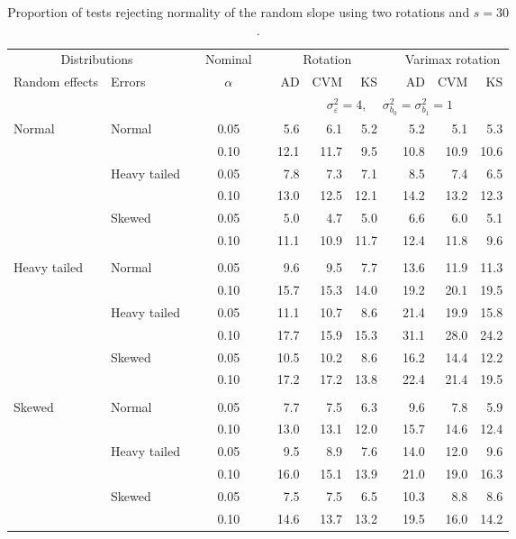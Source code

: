 \begin{table}[ht]
\centering
\caption{\label{tab:fixedsimb130} Proportion of tests rejecting normality of the random slope using two rotations and $s = 30$.}
\begin{scriptsize}
\begin{tabular}{ll p{.1cm} c p{.1cm} rrr p{.1cm} rrr}
  \hline
  \multicolumn{2}{c}{Distributions}& & Nominal & &  \multicolumn{3}{c}{Rotation} & & \multicolumn{3}{c}{Varimax rotation} \\ \cline{1-2} \cline{6-8} \cline{10-12}   
  Random effects & Errors & & $\alpha$ & & AD & CVM & KS & & AD & CVM & KS \\ 
   \hline
& && && \multicolumn{7}{c}{$\sigma_{\varepsilon}^2 = 4$, \ \ $\sigma_{b_0}^2 = \sigma_{b_1}^2 = 1$} \\ \cline{6-12}
\rowcolor{gray!20} Normal & Normal &  & 0.05 &  & 5.6 & 6.1 & 5.2 &  & 5.2 & 5.1 & 5.3 \\ 
\rowcolor{gray!20}    &  &  & 0.10 &  & 12.1 & 11.7 & 9.5 &  & 10.8 & 10.9 & 10.6 \\ 
\rowcolor{gray!20}    & Heavy tailed &  & 0.05 &  & 7.8 & 7.3 & 7.1 &  & 8.5 & 7.4 & 6.5 \\ 
\rowcolor{gray!20}    &  &  & 0.10 &  & 13.0 & 12.5 & 12.1 &  & 14.2 & 13.2 & 12.3 \\ 
\rowcolor{gray!20}    & Skewed &  & 0.05 &  & 5.0 & 4.7 & 5.0 &  & 6.6 & 6.0 & 5.1 \\ 
\rowcolor{gray!20}    &  &  & 0.10 &  & 11.1 & 10.9 & 11.7 &  & 12.4 & 11.8 & 9.6 \\ 
&&&&&&&&&&&\\
  Heavy tailed & Normal &  & 0.05 &  & 9.6 & 9.5 & 7.7 &  & 13.6 & 11.9 & 11.3 \\ 
   &  &  & 0.10 &  & 15.7 & 15.3 & 14.0 &  & 19.2 & 20.1 & 19.5 \\ 
   & Heavy tailed &  & 0.05 &  & 11.1 & 10.7 & 8.6 &  & 21.4 & 19.9 & 15.8 \\ 
   &  &  & 0.10 &  & 17.7 & 15.9 & 15.3 &  & 31.1 & 28.0 & 24.2 \\ 
   & Skewed &  & 0.05 &  & 10.5 & 10.2 & 8.6 &  & 16.2 & 14.4 & 12.2 \\ 
   &  &  & 0.10 &  & 17.2 & 17.2 & 13.8 &  & 22.4 & 21.4 & 19.5 \\ 
&&&&&&&&&&&\\
  Skewed & Normal &  & 0.05 &  & 7.7 & 7.5 & 6.3 &  & 9.6 & 7.8 & 5.9 \\ 
   &  &  & 0.10 &  & 13.0 & 13.1 & 12.0 &  & 15.7 & 14.6 & 12.4 \\ 
   & Heavy tailed &  & 0.05 &  & 9.5 & 8.9 & 7.6 &  & 14.0 & 12.0 & 9.6 \\ 
   &  &  & 0.10 &  & 16.0 & 15.1 & 13.9 &  & 21.0 & 19.0 & 16.3 \\ 
   & Skewed &  & 0.05 &  & 7.5 & 7.5 & 6.5 &  & 10.3 & 8.8 & 8.6 \\ 
   &  &  & 0.10 &  & 14.6 & 13.7 & 13.2 &  & 19.5 & 16.0 & 14.2 \\ 


\end{tabular}
\end{scriptsize}
\end{table}
